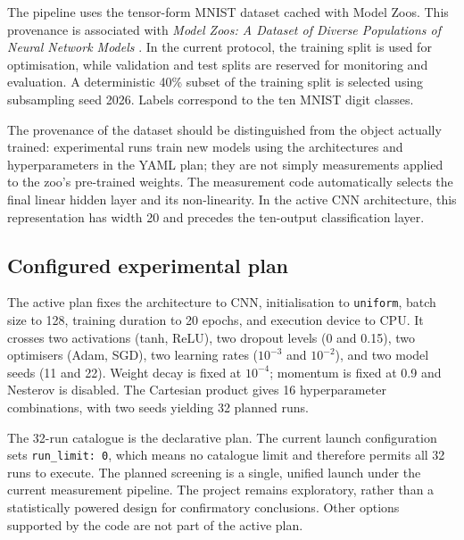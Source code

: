 \documentclass[11pt,a4paper]{article}
\begin{document}
The pipeline uses the tensor-form MNIST dataset cached with Model Zoos. This provenance is associated with \emph{Model Zoos: A Dataset of Diverse Populations of Neural Network Models} \citep{schurholt2022modelzoos}. In the current protocol, the training split is used for optimisation, while validation and test splits are reserved for monitoring and evaluation. A deterministic 40\% subset of the training split is selected using subsampling seed 2026. Labels correspond to the ten MNIST digit classes.

The provenance of the dataset should be distinguished from the object actually trained: experimental runs train new models using the architectures and hyperparameters in the YAML plan; they are not simply measurements applied to the zoo's pre-trained weights. The measurement code automatically selects the final linear hidden layer and its non-linearity. In the active CNN architecture, this representation has width 20 and precedes the ten-output classification layer.

\subsection{Configured experimental plan}

The active plan fixes the architecture to CNN, initialisation to \texttt{uniform}, batch size to 128, training duration to 20 epochs, and execution device to CPU. It crosses two activations (tanh, ReLU), two dropout levels (0 and 0.15), two optimisers (Adam, SGD), two learning rates ($10^{-3}$ and $10^{-2}$), and two model seeds (11 and 22). Weight decay is fixed at $10^{-4}$; momentum is fixed at 0.9 and Nesterov is disabled. The Cartesian product gives 16 hyperparameter combinations, with two seeds yielding 32 planned runs.

The 32-run catalogue is the declarative plan. The current launch configuration sets \texttt{run\_limit: 0}, which means no catalogue limit and therefore permits all 32 runs to execute. The planned screening is a single, unified launch under the current measurement pipeline. The project remains exploratory, rather than a statistically powered design for confirmatory conclusions. Other options supported by the code are not part of the active plan.
\end{document}
